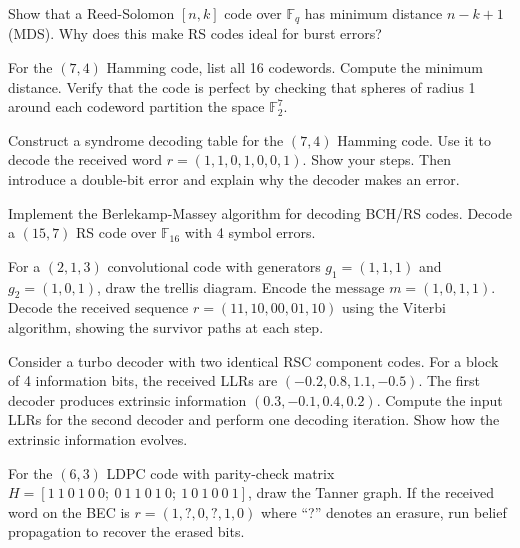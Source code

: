 \begin{exercise}[Basic]
Show that a Reed-Solomon $[n,k]$ code over $\mathbb{F}_q$ has minimum distance $n-k+1$ (MDS). Why does this make RS codes ideal for burst errors?
\end{exercise}

\begin{exercise}[Basic]
For the $(7,4)$ Hamming code, list all 16 codewords. Compute the minimum distance. Verify that the code is perfect by checking that spheres of radius 1 around each codeword partition the space $\mathbb{F}_2^7$.
\end{exercise}

\begin{exercise}[Basic]
Construct a syndrome decoding table for the $(7,4)$ Hamming code. Use it to decode the received word $r = (1,1,0,1,0,0,1)$. Show your steps. Then introduce a double-bit error and explain why the decoder makes an error.
\end{exercise}

\begin{exercise}[Intermediate]
Implement the Berlekamp-Massey algorithm for decoding BCH/RS codes. Decode a $(15,7)$ RS code over $\mathbb{F}_{16}$ with 4 symbol errors.
\end{exercise}

\begin{exercise}[Intermediate]
For a $(2,1,3)$ convolutional code with generators $g_1 = (1,1,1)$ and $g_2 = (1,0,1)$, draw the trellis diagram. Encode the message $m = (1,0,1,1)$. Decode the received sequence $r = (11, 10, 00, 01, 10)$ using the Viterbi algorithm, showing the survivor paths at each step.
\end{exercise}

\begin{exercise}[Intermediate]
Consider a turbo decoder with two identical RSC component codes. For a block of 4 information bits, the received LLRs are $(-0.2, 0.8, 1.1, -0.5)$. The first decoder produces extrinsic information $(0.3, -0.1, 0.4, 0.2)$. Compute the input LLRs for the second decoder and perform one decoding iteration. Show how the extrinsic information evolves.
\end{exercise}

\begin{exercise}[Intermediate]
For the $(6,3)$ LDPC code with parity-check matrix $H = [1\ 1\ 0\ 1\ 0\ 0;\ 0\ 1\ 1\ 0\ 1\ 0;\ 1\ 0\ 1\ 0\ 0\ 1]$, draw the Tanner graph. If the received word on the BEC is $r = (1, ?, 0, ?, 1, 0)$ where ``?'' denotes an erasure, run belief propagation to recover the erased bits.
\end{exercise}

